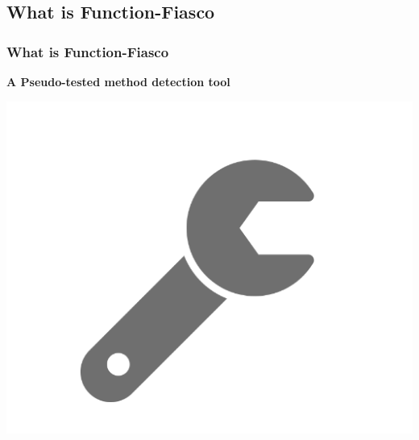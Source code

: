 \subsection{What is Function-Fiasco}
\begin{frame}
  \frametitle{What is Function-Fiasco}
    \begin{center}
      \huge{\textbf{A Pseudo-tested method detection tool}}

      \includegraphics[scale = .15]{images/wrench}
    \end{center}
\end{frame}

